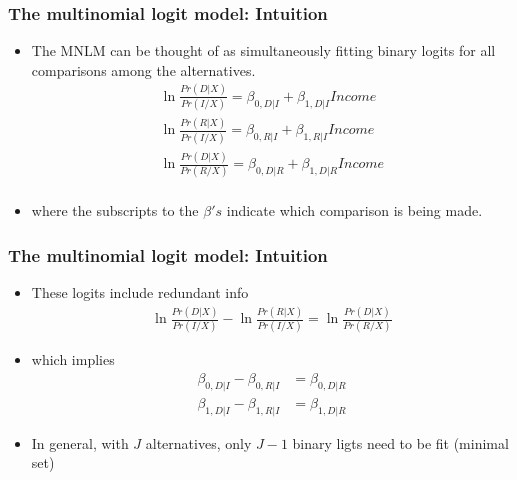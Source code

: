\documentclass[
  shownotes,
  xcolor={svgnames},
  hyperref={colorlinks,citecolor=DarkBlue,linkcolor=DarkRed,urlcolor=DarkBlue}
  , aspectratio=169]{beamer}
\begin{document}
\begin{frame}[fragile]
\frametitle{The multinomial logit model: Intuition}



\begin{itemize}
 \item The MNLM can be thought of as simultaneously fitting binary logits for all comparisons among the alternatives. 
\medskip
  \begin{align}
  \ln \frac{Pr(D|X)}{Pr(I/X)}=\beta_{0,D|I} +\beta_{1,D|I} Income \\ \nonumber
  \ln \frac{Pr(R|X)}{Pr(I/X)}=\beta_{0,R|I} +\beta_{1,R|I} Income \\ \nonumber
  \ln \frac{Pr(D|X)}{Pr(R/X)}=\beta_{0,D|R} +\beta_{1,D|R} Income \\ \nonumber
  \end{align}

\item where the subscripts to the $\beta's$ indicate which comparison is being made. 



\end{itemize}


\end{frame}
\begin{frame}[fragile]
\frametitle{The multinomial logit model: Intuition}



\begin{itemize}
 \item These logits include redundant info
\medskip
\begin{align}
\ln \frac{Pr(D|X)}{Pr(I/X)}- \ln \frac{Pr(R|X)}{Pr(I/X)}= \ln \frac{Pr(D|X)}{Pr(R/X)}
\end{align}

\medskip
\item which implies
\medskip
 \begin{align}
  \beta_{0,D|I} - \beta_{0,R|I} &=\beta_{0,D|R} \\
  \beta_{1,D|I}-\beta_{1,R|I} &= \beta_{1,D|R} 
\end{align}

\medskip
\item In general, with $J$ alternatives, only $J-1$ binary ligts need to be fit (minimal set)

 

\end{itemize}

\end{frame}
\end{document}
